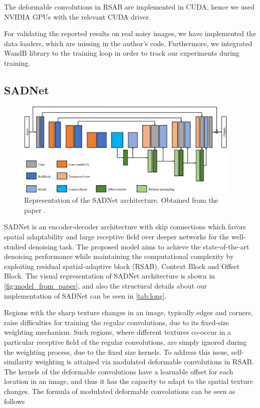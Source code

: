 The deformable convolutions in RSAB are implemented in CUDA, hence we used NVIDIA GPUs with the relevant CUDA driver.

For validating the reported results on real noisy images, we have implemented the data loaders, which are missing in the author's code. Furthermore, we integrated WandB \cite{wandb} library to the training loop in order to track our experiments during training.


\subsection{SADNet}
\begin{figure}[t]
    \begin{center}
        \includegraphics[width=0.96\textwidth]{images/model_from_paper.png}
    \end{center}
    \caption{Representation of the SADNet architecture. Obtained from the paper \cite{10.1007/978-3-030-58577-8_11}.}
    \label{fig:model_from_paper}
\end{figure}

SADNet is an encoder-decoder architecture with skip connections which favors spatial adaptability and large receptive field over deeper networks for the well-studied denoising task. The proposed model aims to achieve the state-of-the-art denoising performance while maintaining the computational complexity by exploiting residual spatial-adaptive block (RSAB), Context Block and Offset Block. The visual representation of SADNet architecture is shown in \autoref{fig:model_from_paper}, and also the structural details about our implementation of SADNet can be seen in \autoref{tab:long}.

Regions with the sharp texture changes in an image, typically edges and corners, raise difficulties for training the regular convolutions, due to its fixed-size weighting mechanism. Such regions, where different textures co-occur in a particular receptive field of the regular convolutions, are simply ignored during the weighting process, due to the fixed size kernels. To address this issue, self-similarity weighting is attained via modulated deformable convolutions \cite{deform} in RSAB. The kernels of the deformable convolutions have a learnable offset for each location in an image, and thus it has the capacity to adapt to the spatial texture changes. The formula of modulated deformable convolutions can be seen as follows 

